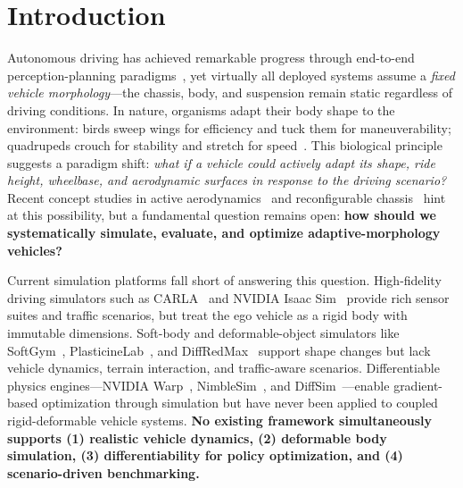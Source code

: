 \section{Introduction}

Autonomous driving has achieved remarkable progress through end-to-end perception-planning paradigms~\cite{uniad2023,vad2023,sparsedrive2024,drivelm2024}, yet virtually all deployed systems assume a \emph{fixed vehicle morphology}---the chassis, body, and suspension remain static regardless of driving conditions.
In nature, organisms adapt their body shape to the environment: birds sweep wings for efficiency and tuck them for maneuverability; quadrupeds crouch for stability and stretch for speed~\cite{biewener2003,morphbio2024}.
This biological principle suggests a paradigm shift: \emph{what if a vehicle could actively adapt its shape, ride height, wheelbase, and aerodynamic surfaces in response to the driving scenario?}
Recent concept studies in active aerodynamics~\cite{morphaero2025,adaptvehicle2024} and reconfigurable chassis~\cite{reconfchassis2024} hint at this possibility, but a fundamental question remains open: \textbf{how should we systematically simulate, evaluate, and optimize adaptive-morphology vehicles?}

Current simulation platforms fall short of answering this question.
High-fidelity driving simulators such as CARLA~\cite{carla2025} and NVIDIA Isaac Sim~\cite{isaacsim2024} provide rich sensor suites and traffic scenarios, but treat the ego vehicle as a rigid body with immutable dimensions.
Soft-body and deformable-object simulators like SoftGym~\cite{softgym2020}, PlasticineLab~\cite{plasticinelab2021}, and DiffRedMax~\cite{diffredmax2022} support shape changes but lack vehicle dynamics, terrain interaction, and traffic-aware scenarios.
Differentiable physics engines---NVIDIA Warp~\cite{warp2024}, NimbleSim~\cite{nimblesim2023}, and DiffSim~\cite{diffsim2024}---enable gradient-based optimization through simulation but have never been applied to coupled rigid-deformable vehicle systems.
\textbf{No existing framework simultaneously supports (1) realistic vehicle dynamics, (2) deformable body simulation, (3) differentiability for policy optimization, and (4) scenario-driven benchmarking.}

